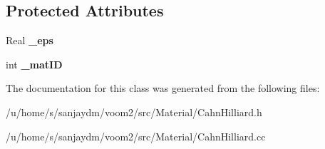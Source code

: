 \subsection*{Protected Attributes}
\begin{DoxyCompactItemize}
\item 
\hypertarget{classvoom_1_1_cahn_hilliard_ab52bb4aa8f129704d907611e653a2c18}{
Real {\bfseries \_\-eps}}
\label{classvoom_1_1_cahn_hilliard_ab52bb4aa8f129704d907611e653a2c18}

\item 
\hypertarget{classvoom_1_1_cahn_hilliard_ad8f2a1ee73c27b7c1af64478b6f65d03}{
int {\bfseries \_\-matID}}
\label{classvoom_1_1_cahn_hilliard_ad8f2a1ee73c27b7c1af64478b6f65d03}

\end{DoxyCompactItemize}


The documentation for this class was generated from the following files:\begin{DoxyCompactItemize}
\item 
/u/home/s/sanjaydm/voom2/src/Material/CahnHilliard.h\item 
/u/home/s/sanjaydm/voom2/src/Material/CahnHilliard.cc\end{DoxyCompactItemize}
